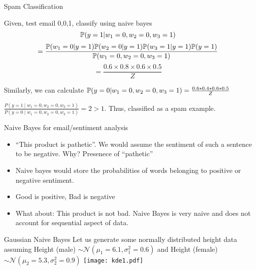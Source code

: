 \documentclass{beamer}
\begin{document}
\begin{frame}{Spam Classification}
    
    Given, test email {0,0,1}, classify using naive bayes
    \pause 
$$
\mathbb{P}(y=1\vert w_{1}=0,w_{2} = 0,w_{3}=1) 
$$
$$ = \frac{\mathbb{P}(w_{1}=0|y=1) \mathbb{P}(w_{2}=0|y=1) \mathbb{P}(w_{3}=1|y=1) \mathbb{P}(y=1)}{\mathbb{P}(w_{1}=0, w_{2}=0, w_{3}=1)}
    $$
    $$ = \frac{0.6\times 0.8 \times 0.6 \times 0.5}{Z}
    $$
    
\pause Similarly, we can calculate $\mathbb{P}(y=0\vert w_{1}=0,w_{2} = 0,w_{3}=1) = \frac{0.6*0.4*0.6*0.5}{Z} $

\pause $\frac{P\left(y=1 \mid w_{1}=0, w_{2}=0, w_{3}=1\right)}{P\left(y=0 \mid w_{1}=0, w_{2}=0, w_{3}=1\right)} = 2 > 1$. Thus, classified as a spam example.
    
\end{frame}

\begin{frame}{Naive Bayes for email/sentiment analysis}
    \begin{itemize}
        \item ``This product is pathetic''. We would assume the sentiment of such a sentence to be negative. Why? Presenece of ``pathetic''
        \item Naive bayes would store the probabilities of words belonging to positive or negative sentiment.
        \item Good is positive, Bad is negative
        \item What about: This product is not bad. Naive Bayes is very naive and does not account for sequential aspect of data.
    \end{itemize}
    
\end{frame}

%    
%    


\begin{frame}{Gaussian Naive Bayes}
    Let us generate some normally distributed height data assuming Height (male) $\sim \mathcal{N}(\mu_1 = 6.1, \sigma_1^2 = 0.6)$
 and Height (female) $\sim \mathcal{N}(\mu_2 = 5.3, \sigma_2^2 = 0.9)$
    \texttt{[image: kde1.pdf]}
\end{frame}
\end{document}
